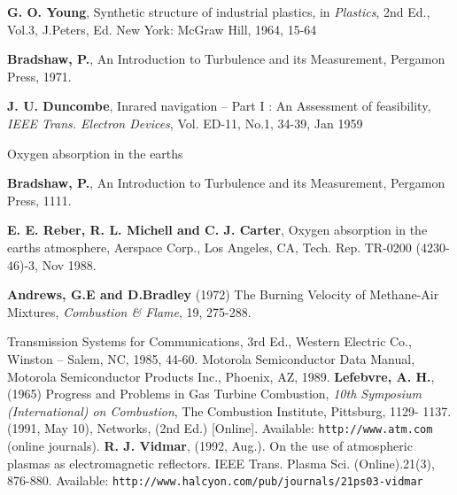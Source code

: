 \newpage
\renewcommand{\bibname}{References}
\begin{thebibliography}{99}




{\bfseries G. O. Young}, Synthetic structure of industrial plastics, in {\em Plastics}, 2nd Ed., Vol.3,
J.Peters, Ed. New York: McGraw Hill, 1964, 15-64

{\bfseries Bradshaw, P.},  An Introduction to Turbulence and its Measurement, Pergamon Press,
1971.

{\bfseries J. U. Duncombe}, Inrared navigation – Part I : An Assessment of feasibility, {\em IEEE
Trans. Electron Devices}, Vol. ED-11, No.1, 34-39, Jan 1959

Oxygen absorption in the earths

{\bfseries Bradshaw, P.},  An Introduction to Turbulence and its Measurement, Pergamon Press,
1111.

{\bfseries E. E. Reber, R. L. Michell and C. J. Carter}, Oxygen absorption in the earths
atmosphere, Aerspace Corp., Los Angeles, CA, Tech. Rep. TR-0200 (4230-46)-3, Nov
1988.

{\bfseries Andrews, G.E and D.Bradley} (1972) The Burning Velocity of Methane-Air Mixtures,
{\em Combustion \& Flame}, 19, 275-288.

Transmission Systems for Communications, 3rd Ed., Western Electric Co., Winston –
Salem, NC, 1985, 44-60.
Motorola Semiconductor Data Manual, Motorola Semiconductor Products Inc.,
Phoenix, AZ, 1989.
{\bfseries Lefebvre, A. H.}, (1965) Progress and Problems in Gas Turbine Combustion, {\em 10th
Symposium (International) on Combustion}, The Combustion Institute, Pittsburg, 1129-
1137.
 (1991, May 10), Networks, (2nd Ed.) [Online]. Available: {\tt http://www.atm.com} (online journals).
{\bfseries R. J. Vidmar}, (1992, Aug.). On the use of atmospheric plasmas as electromagnetic
reflectors. IEEE Trans. Plasma Sci. (Online).21(3), 876-880. Available:
{\tt http://www.halcyon.com/pub/journals/21ps03-vidmar}
\end{thebibliography}